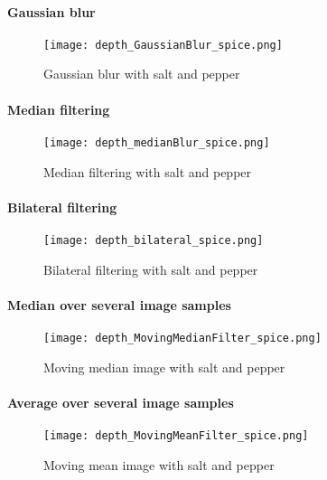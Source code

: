 \documentclass[DIV12,a4paper]{scrartcl}
\begin{document}
\paragraph{Gaussian blur}
\begin{figure}[!htbp]
  \centering
  \texttt{[image: depth\_GaussianBlur\_spice.png]}
  \caption{Gaussian blur with salt and pepper}
  \label{fig:gaussian_blur}
\end{figure}
\paragraph{Median filtering}
\begin{figure}[!htbp]
  \centering
  \texttt{[image: depth\_medianBlur\_spice.png]}
  \caption{Median filtering with salt and pepper}
  \label{fig:median_depth_spice}
\end{figure}
\paragraph{Bilateral filtering}
\begin{figure}[!htbp]
  \centering
  \texttt{[image: depth\_bilateral\_spice.png]}
  \caption{Bilateral filtering with salt and pepper}
  \label{fig:bilateral_depth_spice}
\end{figure}
\paragraph{Median over several image samples}
\begin{figure}[!htbp]
  \centering
  \texttt{[image: depth\_MovingMedianFilter\_spice.png]}
  \caption{Moving median image with salt and pepper}
  \label{fig:moving_median_depth_spice}
\end{figure}
\paragraph{Average over several image samples}
\begin{figure}[!htbp]
  \centering
  \texttt{[image: depth\_MovingMeanFilter\_spice.png]}
  \caption{Moving mean image with salt and pepper}
  \label{fig:moving_mean_depth_spice}
\end{figure}
\end{document}
